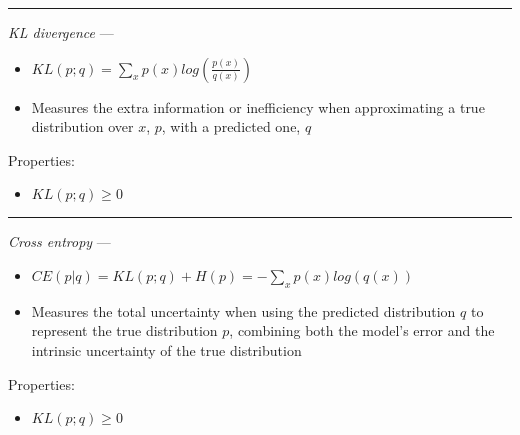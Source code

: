 {\color{lightgray}\hrule height 0.001mm}

\emph{KL divergence} --- 
\begin{itemize}
    \item $KL(p;q) = \sum_x p(x) log(\frac{p(x)}{q(x)})$ 
    \item Measures the extra information or inefficiency when approximating a true distribution over $x$, $p$, with a predicted one, $q$
\end{itemize}
Properties:
\begin{itemize}
    \item $KL(p;q) \geq 0$
\end{itemize}

{\color{lightgray}\hrule height 0.001mm}

\emph{Cross entropy} --- 
\begin{itemize}
    \item $CE(p|q) = KL(p;q) + H(p) = -\sum_x p(x)log(q(x))$ 
    \item Measures the total uncertainty when using the predicted distribution $q$ to represent the true distribution $p$, combining both the model's error and the intrinsic uncertainty of the true distribution 
\end{itemize}
Properties:
\begin{itemize}
    \item $KL(p;q) \geq 0$
\end{itemize}